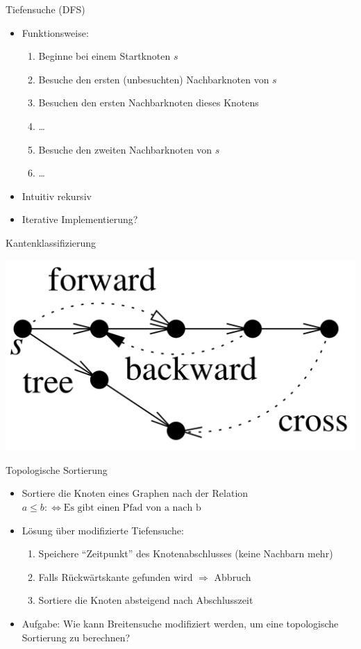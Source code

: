 \begin{frame}{Tiefensuche (DFS)}
	\begin{itemize}
		\item Funktionsweise:
			\begin{enumerate}
				\item Beginne bei einem Startknoten $s$
				\item Besuche den ersten (unbesuchten) Nachbarknoten von $s$
				\item Besuchen den ersten Nachbarknoten dieses Knotens
				\item …
				\item Besuche den zweiten Nachbarknoten von $s$
				\item …
			\end{enumerate}
		\item Intuitiv rekursiv
		\item Iterative Implementierung?
	\end{itemize}
\end{frame}

\begin{frame}{Kantenklassifizierung}
	\begin{center}
		\includegraphics[keepaspectratio,scale=0.25]{images/edges}
	\end{center}
\end{frame}

\begin{frame}{Topologische Sortierung}
	\begin{itemize}
		\item Sortiere die Knoten eines Graphen nach der Relation $a \leq b :\Leftrightarrow \text{Es gibt einen Pfad von a nach b}$
		\item Lösung über modifizierte Tiefensuche:
			\begin{enumerate}
				\item Speichere "`Zeitpunkt"' des Knotenabschlusses (keine Nachbarn mehr)
				\item Falls Rückwärtskante gefunden wird $\Rightarrow$ Abbruch
				\item Sortiere die Knoten absteigend nach Abschlusszeit
			\end{enumerate}
		\item Aufgabe: Wie kann Breitensuche modifiziert werden, um eine topologische Sortierung zu berechnen?
	\end{itemize}
\end{frame}

